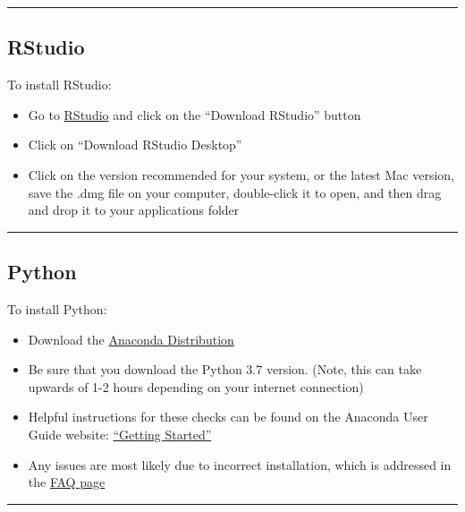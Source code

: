 \documentclass[]{book}
\providecommand{\tightlist}{%
  \setlength{\itemsep}{0pt}\setlength{\parskip}{0pt}}
\begin{document}
\begin{center}\rule{0.5\linewidth}{0.5pt}\end{center}

\hypertarget{rstudio}{%
\subsection{RStudio}\label{rstudio}}

To install RStudio:

\begin{itemize}
\tightlist
\item
  Go to \href{http://www.rstudio.com}{RStudio} and click on the ``Download RStudio'' button
\item
  Click on ``Download RStudio Desktop''
\item
  Click on the version recommended for your system, or the latest Mac version, save the .dmg file on your computer, double-click it to open, and then drag and drop it to your applications folder
\end{itemize}

\begin{center}\rule{0.5\linewidth}{0.5pt}\end{center}

\hypertarget{python}{%
\subsection{Python}\label{python}}

To install Python:

\begin{itemize}
\tightlist
\item
  Download the \href{https://www.anaconda.com/distribution/}{Anaconda Distribution}
\item
  Be sure that you download the Python 3.7 version. (Note, this can take upwards of 1-2 hours depending on your internet connection)
\item
  Helpful instructions for these checks can be found on the Anaconda User Guide website: \href{https://docs.anaconda.com/anaconda/user-guide/getting-started/}{``Getting Started''}
\item
  Any issues are most likely due to incorrect installation, which is addressed in the \href{https://docs.anaconda.com/anaconda/user-guide/faq/}{FAQ page}
\end{itemize}

\begin{center}\rule{0.5\linewidth}{0.5pt}\end{center}
\end{document}
